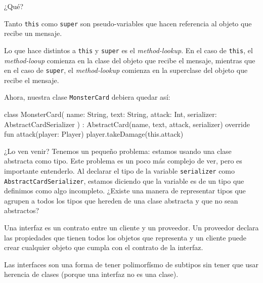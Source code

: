  \begin{center}
    ¿Qué?
  \end{center}

  \begin{defaultbox}
    Tanto \texttt{this} como \texttt{super} son pseudo-variables que hacen referencia al objeto que
    recibe un mensaje.

    Lo que hace distintos a \texttt{this} y \texttt{super} es el \textit{method-lookup}.
    En el caso de \texttt{this}, el \textit{method-looup} comienza en la clase del objeto que 
    recibe el mensaje, mientras que en el caso de \texttt{super}, el \textit{method-lookup} comienza 
    en la superclase del objeto que recibe el mensaje.
  \end{defaultbox}

  Ahora, nuestra clase \texttt{MonsterCard} debiera quedar así:

  \begin{kotlin}
    class MonsterCard(
      name: String,
      text: String,
      attack: Int,
      serializer: AbstractCardSerializer
    ) : AbstractCard(name, text, attack, serializer) {
      override fun attack(player: Player) {
        player.takeDamage(this.attack)
      }
    }
  \end{kotlin}

  ¿Lo ven venir?
  Tenemos un pequeño problema: estamos usando una clase abstracta como tipo.
  Este problema es un poco más complejo de ver, pero es importante entenderlo.
  Al declarar el tipo de la variable \texttt{serializer} como \texttt{AbstractCardSerializer},
  estamos diciendo que la variable es de un tipo que definimos como algo incompleto.
  ¿Existe una manera de representar tipos que agrupen a todos los tipos que hereden de una clase
  abstracta y que no sean abstractos?

  \begin{defaultbox}[Interfaces]
    Una interfaz es un contrato entre un cliente y un proveedor.
    Un proveedor declara las propiedades que tienen todos los objetos que representa y un cliente
    puede crear cualquier objeto que cumpla con el contrato de la interfaz.
  \end{defaultbox}

  \begin{important}
    Las interfaces son una forma de tener polimorfísmo de subtipos sin tener que usar herencia de 
    clases (porque una interfaz no es una clase).  
  \end{important}
  
